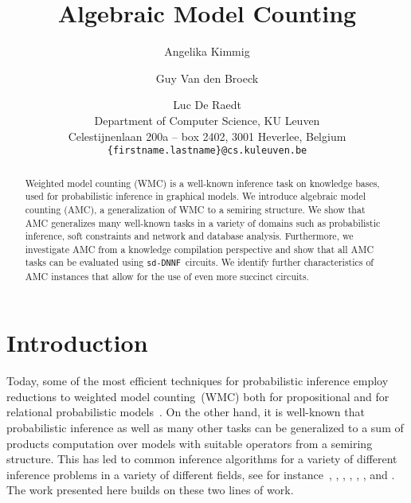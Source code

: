 \documentclass{article}
\theoremstyle{plain}
\theoremstyle{definition}
\newcommand{\sdDNNF}{{\tt sd-DNNF}}
\begin{document}
\graphicspath{{./figures/}}

\title{Algebraic Model Counting
}

\author{Angelika Kimmig         \and
       Guy Van den Broeck \and Luc De Raedt \\ \small{Department of Computer Science, KU Leuven}\\
       \small{Celestijnenlaan 200a -- box 2402, 3001 Heverlee, Belgium}\\
\small{\texttt{\{firstname.lastname\}@cs.kuleuven.be}}
}
\date{}

\maketitle

\begin{abstract}
Weighted model counting (WMC) is a well-known inference task on knowledge bases, used for probabilistic inference in graphical models.
We introduce algebraic model counting (AMC), a generalization of WMC to a semiring 
structure. We  show that  AMC generalizes many well-known tasks in a
variety of domains such as probabilistic inference, 
soft constraints and network and database analysis.  
Furthermore, we investigate AMC from a knowledge compilation perspective
and show that all AMC tasks can be evaluated using  \sdDNNF\ circuits. 
We  identify further characteristics of AMC instances that allow for the use of 
 even  more succinct circuits.
\end{abstract}



\section{Introduction}\label{sec:intro}
Today, some of the most efficient techniques for probabilistic
inference employ reductions to weighted model counting~(WMC) 
both for propositional and for relational
probabilistic models~\citep{Park02,Sang05,Darwiche09,Fierens11}.
 On the other hand, it is well-known that probabilistic
inference as well as many other tasks can be generalized to a sum of
products computation over models with suitable operators from a semiring structure.
This has led to
common inference algorithms for a variety of different inference
problems
in a variety of different fields, see for instance~\citet{Goodman99},
\citet{Eisner05}, \citet{Meseguer06}, \citet{Green2007},
\citet{bacchus2009solving}, \citet{Larrosa10}, \citet{baras2010path} and
\citet{Kimmig11}. The work presented here builds on these two lines of work.
\end{document}

